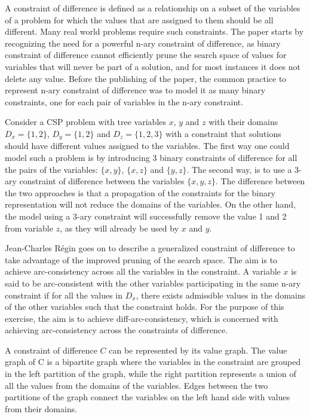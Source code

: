 \documentclass{l4proj}
\begin{document}
\noindent A constraint of difference is defined as a relationship on a subset of the variables of a problem for which the values that are assigned to them should be all different. Many real world problems require such constraints. The paper starts by recognizing the need for a powerful n-ary constraint of difference, as binary constraint of difference cannot efficiently prune the search space of values for variables that will never be part of a solution, and for most instances it does not delete any value. Before the publishing of the paper, the common practice to represent n-ary constraint of difference was to model it as many binary constraints, one for each pair of variables in the n-ary constraint.

\noindent Consider a CSP problem with tree variables $x$, $y$ and $z$ with their domains $D_x = \{1, 2\}$, $D_y = \{1, 2\}$ and $D_z = \{1, 2, 3\}$ with a constraint that solutions should have different values assigned to the variables. The first way one could model such a problem is by introducing 3 binary constraints of difference for all the pairs of the variables: $\{x, y\}$, $\{x, z\}$ and $\{y, z\}$. The second way, is to use a 3-ary constraint of difference between the variables $\{x, y, z\}$. The difference between the two approaches is that a propagation of the constraints for the binary representation will not reduce the domains of the variables. On the other hand, the model using a 3-ary constraint will successfully remove the value 1 and 2 from variable $z$, as they will already be used by $x$ and $y$.

\noindent Jean-Charles R\'egin \cite{regin1994filtering} goes on to describe a generalized constraint of difference to take advantage of the improved pruning of the search space. The aim is to achieve arc-consistency across all the variables in the constraint. A variable $x$ is said to be arc-consistent with the other variables participating in the same n-ary constraint if for all the values in $D_x$, there exists admissible values in the domains of the other variables such that the constraint holds. For the purpose of this exercise, the aim is to achieve diff-arc-consistency, which is concerned with achieving arc-consistency across the constraints of difference.

\noindent A constraint of difference $C$ can be represented by its value graph. The value graph of C is a bipartite graph where the variables in the constraint are grouped in the left partition of the graph, while the right partition represents a union of all the values from the domains of the variables. Edges between the two partitions of the graph connect the variables on the left hand side with values from their domains.
\end{document}

